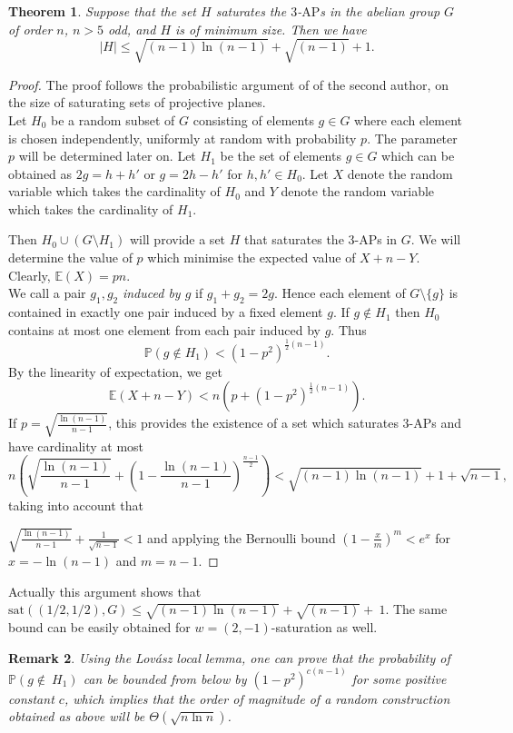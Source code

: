 \documentclass[11pt]{article}
\numberwithin{table}{section}
\newcommand{\E}{\mathbb{E}}
\newcommand{\pP}{\mathbb{P}}
\newcommand{\sat}{\mathrm{sat}}
\newtheorem{theorem}{Theorem}[section]
\newtheorem{remark}[theorem]{Remark}
\theoremstyle{definition}
\begin{document}
	
	\begin{theorem}\label{random_satu} Suppose that the set $H$ saturates the $3$-$\mathrm{AP}$s in  the abelian group $G$ of order $n$, $n>5$ odd, and $H$ is of minimum size. Then we have $$|H|\leq \sqrt{(n-1)\ln{(n-1)}}+ \sqrt{(n-1)}+1.$$    
	\end{theorem}
	
	\begin{proof} The proof follows the probabilistic argument of \cite{Nagy} of the second author, on the size of saturating sets of projective planes.\\ Let $H_0$ be a random subset of $G$ 
		consisting of elements $g\in G$ where each element is chosen independently, uniformly at random with probability $p$. The parameter $p$ will be determined later on.
		Let $H_1$ be the set of elements $g\in G$ which  can be obtained as 
		$2g= h+h'$ or $g= 2h-h'$ for $h,h'\in H_0$.
		Let $X$ denote the random variable which takes the cardinality of $H_0$ and $Y $ denote the random variable which takes the cardinality of $H_1$. 
		
		Then $H_0\cup (G\setminus H_1)$ will provide a set $H$ that saturates the $3$-$\mathrm{AP}$s in $G$. We will determine the value of $p$ which minimise the expected value of $X+n-Y$.
		Clearly, $\E(X)=pn$. \\
		We call a pair $g_1, g_2$\textit{ induced by $g$} if $g_1+g_2=2g$. Hence each element of $G\setminus \{g\}$ is contained in exactly one pair induced by a fixed element $g$. If $g\not \in H_1$ then $H_0$ contains at most one element from each pair induced by $g$.
		Thus $$\pP(g\not \in H_1)<(1-p^2)^{\frac{1}{2}(n-1)}.$$
		By the linearity of expectation, we get 
		$$\E(X+n-Y)<n\left(p+(1-p^2)^{\frac{1}{2}(n-1)}\right).$$
		If $p=\sqrt{\frac{\ln{(n-1)}}{{n-1}}}$, this provides the existence of a set which saturates $3$-$\mathrm{AP}$s and have cardinality at most $$n\left(\sqrt{\frac{\ln{(n-1)}}{{n-1}}}+\left(1-\frac{\ln{(n-1)}}{n-1}\right)^{\frac{n-1}{2}}\right)<\sqrt{(n-1)\ln{(n-1)}}+1+\sqrt{n-1},$$
		taking into account that 
		
		$\sqrt{\frac{\ln{(n-1)}}{{n-1}}}+\frac{1}{\sqrt{n-1}}<1$ and applying the Bernoulli bound $(1-\frac{x}{m})^m<e^{x}$ for $x=-\ln{(n-1)}$ and $m=n-1$.
	\end{proof}
	Actually this argument shows that $\sat((1/2, 1/2), G)\leq  \sqrt{(n-1)\ln{(n-1)}}+ \sqrt{(n-1)}+~1$. The same bound can be easily obtained for $w=(2, -1)$-saturation as well.
	
	\begin{remark}
		Using the Lovász local lemma, one can prove that the probability of  $\pP(g\not \in~ H_1)$ can be  bounded from below by $(1-p^2)^{c(n-1)}$ for some positive constant $c$, which implies that the order of magnitude of a random construction obtained as above will be $\Theta(\sqrt{n \ln {n}})$.
	\end{remark}
	
\end{document}
